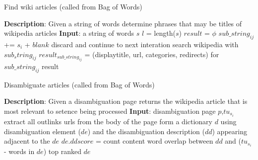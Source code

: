 \documentclass[11pt]{article}
\begin{document}
\begin{algorithm}
\small
\caption{Find wiki articles (called from Bag of Words)}
\label{alg:findwikiarticles}
\begin{algorithmic}
\STATE \textbf{Description}: Given a string of words determine phrases
that may be titles of wikipedia articles
\STATE \textbf{Input}: a string of words $s$
\STATE $l$ = length($s$)
\STATE $result$ = $\phi$
               \STATE $sub\_string_{ij}$ += $s_i$ + $blank$
       \ENDFOR
               \STATE discard and continue to next interation
       \ELSE
               \STATE search wikipedia with $sub_string_{ij}$
               \STATE $result_{sub\_string_{ij}}$ = (displaytitle, url, categories,
redirects) for $sub\_string_{ij}$
       \ENDIF
\ENDFOR
\RETURN result
\end{algorithmic}
\end{algorithm}

\pagebreak

\begin{algorithm}
\small
\caption{Disambiguate articles (called from Bag of Words)}
\label{alg:disambiguate}
\begin{algorithmic}
\STATE \textbf{Description}: Given a disambiguation page returns the
wikipedia article that is most relevant to setence being processed
\STATE \textbf{Input}: disambiguation page $p$,$tu_{s_{i}}$
\STATE extract all outlinks urls from the body of the page
\STATE form a dictionary $d$ using disambiguation element ($de$) and
the disambiguation description ($dd$) appearing adjacent to the $de$
       \STATE $de.ddscore$ = count content word overlap between $dd$ and
($tu_{s_{i}}$ - words in  $de$)
\ENDFOR
\RETURN top ranked $de$
\end{algorithmic}
\end{algorithm}
\end{document}
